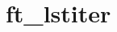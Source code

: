 \chapter{ft\+\_\+lstiter}
\hypertarget{md_Documentation_2ft__lstiter}{}\label{md_Documentation_2ft__lstiter}
